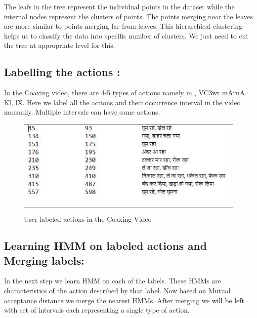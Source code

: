 \def\DevnagVersion{2.15}\documentclass[a4paper, 11pt, notitlepage]{report}
\begin{document}
 The leafs in the tree represent the individual points in the dataset while the internal nodes represent the clusters of points. The points merging near the leaves are more similar to points merging far from leaves. This hierarchical clustering helps us to classify the data into specific number of clusters. We just need to cut the tree at appropriate level for this.\\
 
\noindent \colorbox{gray}{\hspace{\linewidth}\hspace{-2\fboxsep}} 

\subsection{Labelling the actions :}
In the Coaxing video, there are 4-5 types of actions namely {\dn {}m {\rs ,\re} V\3C3wr mArnA{\rs ,\re} K\?l{\rs ,\re} lX}. Here we label all the actions and their occurrence interval in the video manually. Multiple intervals can have same actions.

\begin{figure}[h]
\center
\begin{tabular}{c}
\includegraphics[scale=0.80]{userLabelActions.png}
\end{tabular}
\label{tab:gt}
\caption{User labeled actions in the Coaxing Video}
\end{figure} 

\subsection{Learning HMM on labeled actions and Merging labels:} 
In the next step we learn HMM on each of the labels. These HMMs are characteristics of the action described by that label. Now based on Mutual acceptance distance we merge the nearest HMMs. After merging we will be left with set of intervals each representing a single type of action.\\
\end{document}
